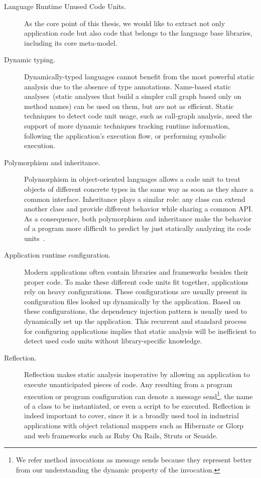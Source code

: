 \begin{description}

\item[Language Runtime Unused Code Units.] As the core point of this thesis, we would like to extract not only application code but also code that belongs to the language base libraries, including its core meta-model.

\item[Dynamic typing.] Dynamically-typed languages cannot benefit from the most powerful static analysis due to the absence of type annotations. Name-based static analyses~(static analyses that build a simpler call graph based only on method names) can be used on them, but are not as efficient. Static techniques to detect code unit usage, such as call-graph analysis, need the support of more dynamic techniques \eg tracking runtime information, following the application's execution flow, or performing symbolic execution.

\item[Polymorphism and inheritance.] Polymorphism in object-oriented languages allows a code unit to treat objects of different concrete types in the same way as soon as they share a common interface. Inheritance plays a similar role: any class can extend another class and provide different behavior while sharing a common API.
As a consequence, both polymorphism and inheritance make the behavior of a program more difficult to predict by just statically analyzing its code units~\cite{Taen89a}.

\item[Application runtime configuration.] Modern applications often contain libraries and frameworks besides their proper code. 
To make these different code units fit together, applications rely on heavy configurations. 
These configurations are usually present in configuration files looked up dynamically by the application. 
Based on these configurations, the dependency injection pattern is usually used to dynamically set up the application. 
This recurrent and standard process for configuring applications implies that static analysis will be inefficient to detect used code units without library-specific knowledge.

\item[Reflection.] Reflection makes static analysis inoperative by allowing an application to execute unanticipated pieces of code. 
Any  resulting from a program execution or program configuration can denote a message send\footnote{We refer method invocations as message sends because they represent better from our understanding the dynamic property of the invocation.}, the name of a class to be instantiated, or even a script to be executed. Reflection is indeed important to cover, since it is a broadly used tool in industrial applications with object relational mappers such as Hibernate or Glorp and web frameworks such as Ruby On Rails, Struts or Seaside.
\end{description}

